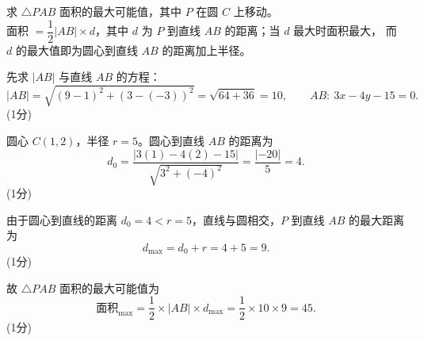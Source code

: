 \documentclass[12pt,a4paper]{exam-zh}
\begin{document}
\begin{solution}
    求 $\triangle PAB$ 面积的最大可能值，其中 $P$ 在圆 $C$ 上移动。 \\
    面积 $=\dfrac12 |AB|\times d$，其中 $d$ 为 $P$ 到直线 $AB$ 的距离；当 $d$ 最大时面积最大，
    而 $d$ 的最大值即为圆心到直线 $AB$ 的距离加上半径。

    先求 $|AB|$ 与直线 $AB$ 的方程：
    \[
        |AB| = \sqrt{(9-1)^2+(3-(-3))^2} = \sqrt{64+36} = 10,
        \qquad
        AB:\ 3x - 4y - 15 = 0.
    \]
    \hfill (1分)

    圆心 $C(1,2)$，半径 $r=5$。圆心到直线 $AB$ 的距离为
    \[
        d_0 = \frac{|3(1)-4(2)-15|}{\sqrt{3^2+(-4)^2}} = \frac{|-20|}{5} = 4.
    \]
    \hfill (1分)

    由于圆心到直线的距离 $d_0=4 < r=5$，直线与圆相交，$P$ 到直线 $AB$ 的最大距离为
    \[
        d_{\max} = d_0 + r = 4+5 = 9.
    \]
    \hfill (1分)

    故 $\triangle PAB$ 面积的最大可能值为
    \[
        \text{面积}_{\max} = \frac12 \times |AB| \times d_{\max} = \frac12 \times 10 \times 9 = 45.
    \]
    \hfill (1分)
\end{solution}
\end{document}
